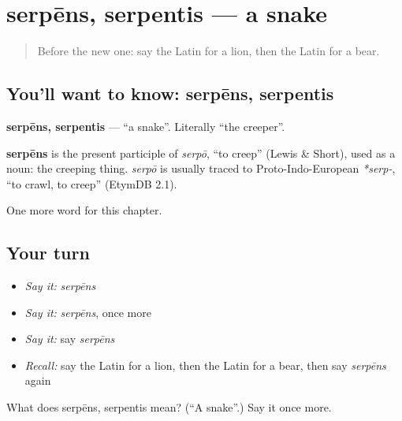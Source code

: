 \section[serpēns, serpentis]{serpēns, serpentis — a snake}

\label{lesson:LA-C91-serpens}



\begin{quote}
Before the new one: say the Latin for a lion, then the Latin for a bear.
\end{quote}

\subsection*{You'll want to know: serpēns, serpentis}
\textbf{serpēns, serpentis} — \textquotedblleft{}a snake\textquotedblright{}. Literally \textquotedblleft{}the creeper\textquotedblright{}.

\begin{cousinweb}
\textbf{serpēns} is the present participle of \emph{serpō}, \textquotedblleft{}to creep\textquotedblright{} (Lewis \& Short), used as a noun: the creeping thing. \emph{serpō} is usually traced to Proto-Indo-European \emph{*serp-}, \textquotedblleft{}to crawl, to creep\textquotedblright{} (EtymDB 2.1).
\end{cousinweb}

\begin{grammarlens}[title={What you've built}]
One more word for this chapter.
\end{grammarlens}

\subsection*{Your turn}
\begin{itemize}
\raggedright
  \item \emph{Say it:} \emph{serpēns}
  \item \emph{Say it:} \emph{serpēns}, once more
  \item \emph{Say it:} say \emph{serpēns}
  \item \emph{Recall:} say the Latin for a lion, then the Latin for a bear, then say \emph{serpēns} again
\end{itemize}

\begin{tcolorbox}[breakable,colback=teal!4,colframe=teal!35!black,title={Before you move on}]
What does serpēns, serpentis mean? (\textquotedblleft{}A snake\textquotedblright{}.) Say it once more.
\end{tcolorbox}
